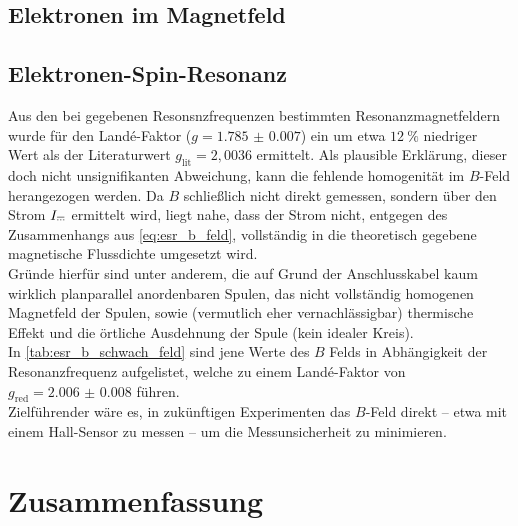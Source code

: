 \documentclass[ngerman]{scrartcl}
\newcommand{\mathdirectcurrent}{\mathrel{\mathpalette\mathdirectcurrentinner\relax}}
\newcommand{\mathdirectcurrentinner}[2]{%
  \settowidth{\dimen0}{$#1=$}%
  \vbox to .85ex {\offinterlineskip
    \hbox to \dimen0{\hss\leaders\hrule\hskip.85\dimen0\hss}
    \vskip.35ex
    \hbox to \dimen0{\hss
      \leaders\hrule\hskip.17\dimen0
      \hskip.17\dimen0
      \leaders\hrule\hskip.17\dimen0
      \hskip.17\dimen0
      \leaders\hrule\hskip.17\dimen0
    \hss}
    \vfill
  }%
}
\begin{document}
\subsection{Elektronen im Magnetfeld}

\subsection{Elektronen-Spin-Resonanz}
Aus den bei gegebenen Resonsnzfrequenzen bestimmten Resonanzmagnetfeldern wurde für den Landé-Faktor ($g = \num{1.785(7)}$) ein um etwa $\SI{12}{\percent}$ niedriger Wert als der Literaturwert $g_{\text{lit}} = 2,0036$ \cite{ref:angabe_esr} ermittelt.
Als plausible Erklärung, dieser doch nicht unsignifikanten Abweichung, kann die fehlende homogenität im $B$-Feld herangezogen werden. Da $B$ schließlich nicht direkt gemessen, sondern über den Strom $I_{\mathdirectcurrent{}}$ ermittelt wird, liegt nahe, dass der Strom nicht, entgegen des Zusammenhangs aus \autoref{eq:esr_b_feld}, vollständig in die theoretisch gegebene magnetische Flussdichte umgesetzt wird. \\
Gründe hierfür sind unter anderem, die auf Grund der Anschlusskabel kaum wirklich planparallel anordenbaren Spulen, das nicht vollständig homogenen Magnetfeld der Spulen, sowie (vermutlich eher vernachlässigbar) thermische Effekt und die örtliche Ausdehnung der Spule (kein idealer Kreis). \\
In \autoref{tab:esr_b_schwach_feld} sind jene Werte des $B$ Felds in Abhängigkeit der Resonanzfrequenz aufgelistet, welche zu einem Landé-Faktor von $g_{\text{red}} = \num{2.006(8)}$ führen. \\
Zielführender wäre es, in zukünftigen Experimenten das $B$-Feld direkt -- etwa mit einem Hall-Sensor zu messen -- um die Messunsicherheit zu minimieren. 

\section{Zusammenfassung}
\label{sec:zusammenfassung}



\clearpage
\printbibliography

\listoffigures

\listoftables
\end{document}
